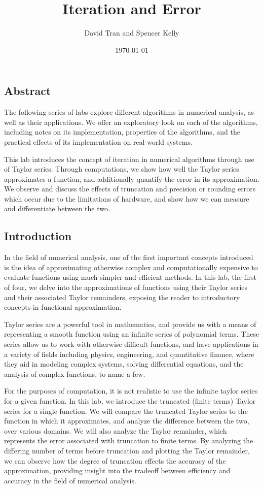 \documentclass[letter,11pt]{article}
\title{Iteration and Error}
\author{David Tran and Spencer Kelly}
\date{\today}
\begin{document}
\maketitle

\subsection*{Abstract}
The following series of labs explore different algorithms in numerical analysis, as well as their applications. We offer an exploratory look on each of the algorithms, including notes on its implementation, properties of the algorithms, and the practical effects of its implementation on real-world systems.

This lab introduces the concept of iteration in numerical algorithms through use of Taylor series. Through computations, we show how well the Taylor series approximates a function, and additionally quantify the error in its approximation. We observe and discuss the effects of truncation and precision or rounding errors which occur due to the limitations of hardware, and show how we can measure and differentiate between the two.

\subsection*{Introduction}
In the field of numerical analysis, one of the first important concepts introduced is the idea of approximating otherwise complex and computationally expensive to evaluate functions using much simpler and efficient methods.
In this lab, the first of four, we delve into the approximations of functions using their Taylor series and their associated Taylor remainders, exposing the reader to introductory concepts in functional approximation.

Taylor series are a powerful tool in mathematics, and provide us with a means of representing a smooth function using an infinite series of polynomial terms.
These series allow us to work with otherwise difficult functions, and have applications in a variety of fields including physics, engineering, and quantitative finance, where they aid in modeling complex systems, solving differential equations, and the analysis of complex functions, to name a few.

For the purposes of computation, it is not realistic to use the infinite taylor series for a given function.
In this lab, we introduce the truncated (finite terms) Taylor series for a single function.
We will compare the truncated Taylor series to the function in which it approximates, and analyze the difference between the two, over various domains.
We will also analyze the Taylor remainder, which represents the error associated with truncation to finite terms.
By analyzing the differing number of terms before truncation and plotting the Taylor remainder, we can observe how the degree of truncation effects the accuracy of the approximation, providing insight into the tradeoff between efficiency and accuracy in the field of numerical analysis.
\end{document}
